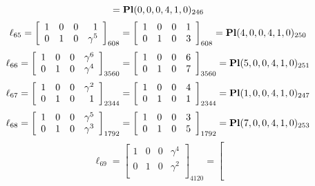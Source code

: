 \documentclass{article}
\begin{document}
{$$={\rm\bf Pl}(0,0,0,4,1,0 )_{246}$$
$$
\ell_{65} = 
\left[
\begin{array}{*{4}{r}}
1 & 0 & 0 & 1\\
0 & 1 & 0 & \gamma^{5}\\
\end{array}
\right]
_{608}
=
\left[
\begin{array}{*{4}c}
1  & 0  & 0  & 1\\
0  & 1  & 0  & 3\\
\end{array}
\right]_{608}
={\rm\bf Pl}(4,0,0,4,1,0 )_{250}$$
$$
\ell_{66} = 
\left[
\begin{array}{*{4}{r}}
1 & 0 & 0 & \gamma^{6}\\
0 & 1 & 0 & \gamma^{4}\\
\end{array}
\right]
_{3560}
=
\left[
\begin{array}{*{4}c}
1  & 0  & 0  & 6\\
0  & 1  & 0  & 7\\
\end{array}
\right]_{3560}
={\rm\bf Pl}(5,0,0,4,1,0 )_{251}$$
$$
\ell_{67} = 
\left[
\begin{array}{*{4}{r}}
1 & 0 & 0 & \gamma^{2}\\
0 & 1 & 0 & 1\\
\end{array}
\right]
_{2344}
=
\left[
\begin{array}{*{4}c}
1  & 0  & 0  & 4\\
0  & 1  & 0  & 1\\
\end{array}
\right]_{2344}
={\rm\bf Pl}(1,0,0,4,1,0 )_{247}$$
$$
\ell_{68} = 
\left[
\begin{array}{*{4}{r}}
1 & 0 & 0 & \gamma^{5}\\
0 & 1 & 0 & \gamma^{3}\\
\end{array}
\right]
_{1792}
=
\left[
\begin{array}{*{4}c}
1  & 0  & 0  & 3\\
0  & 1  & 0  & 5\\
\end{array}
\right]_{1792}
={\rm\bf Pl}(7,0,0,4,1,0 )_{253}$$
$$
\ell_{69} = 
\left[
\begin{array}{*{4}{r}}
1 & 0 & 0 & \gamma^{4}\\
0 & 1 & 0 & \gamma^{2}\\
\end{array}
\right]
_{4120}
=
\left[
$$}
\end{document}
